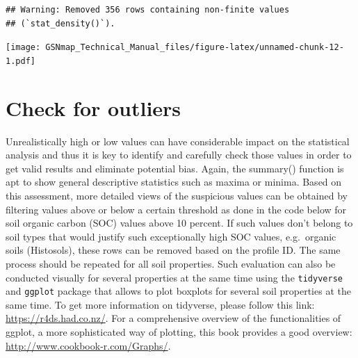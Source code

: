 \documentclass[
  10pt,
  b5paper,
  oneside]{book}
\newenvironment{Shaded}{\begin{snugshade}}{\end{snugshade}}
\newcommand{\CommentTok}[1]{\textcolor[rgb]{0.56,0.35,0.01}{\textit{#1}}}
\newcommand{\DocumentationTok}[1]{\textcolor[rgb]{0.56,0.35,0.01}{\textbf{\textit{#1}}}}
\newcommand{\FunctionTok}[1]{\textcolor[rgb]{0.00,0.00,0.00}{#1}}
\newcommand{\NormalTok}[1]{#1}
\newcommand{\SpecialCharTok}[1]{\textcolor[rgb]{0.00,0.00,0.00}{#1}}
\begin{document}
\begin{verbatim}
## Warning: Removed 356 rows containing non-finite values
## (`stat_density()`).
\end{verbatim}

\texttt{[image: GSNmap\_Technical\_Manual\_files/figure-latex/unnamed-chunk-12-1.pdf]}

\hypertarget{check-for-outliers}{%
\section{Check for outliers}\label{check-for-outliers}}

Unrealistically high or low values can have considerable impact on the statistical analysis and thus it is key to identify and carefully check those values in order to get valid results and eliminate potential bias. Again, the summary() function is apt to show general descriptive statistics such as maxima or minima. Based on this assessment, more detailed views of the suspicious values can be obtained by filtering values above or below a certain threshold as done in the code below for soil organic carbon (SOC) values above 10 percent. If such values don't belong to soil types that would justify such exceptionally high SOC values, e.g.~organic soils (Histosols), these rows can be removed based on the profile ID. The same process should be repeated for all soil properties.
Such evaluation can also be conducted visually for several properties at the same time using the \texttt{tidyverse} and \texttt{ggplot} package that allows to plot boxplots for several soil properties at the same time. To get more information on tidyverse, please follow this link: \url{https://r4ds.had.co.nz/}. For a comprehensive overview of the functionalities of ggplot, a more sophisticated way of plotting, this book provides a good overview: \url{http://www.cookbook-r.com/Graphs/}.

\begin{Shaded}
\end{Shaded}
\end{document}
